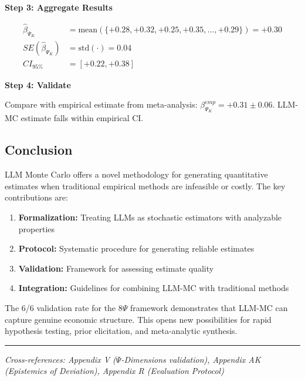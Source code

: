 \begin{tcolorbox}[colback=blue!5!white, colframe=blue!75!black,
    title=\textbf{Worked Example: LLM-MC Protocol Application}]
\textbf{Step 3: Aggregate Results}

\begin{align*}
\hat{\beta}_{\Psi_K} &= \text{mean}(\{+0.28, +0.32, +0.25, +0.35, \ldots, +0.29\}) = +0.30 \\
SE(\hat{\beta}_{\Psi_K}) &= \text{std}(\cdot) = 0.04 \\
CI_{95\%} &= [+0.22, +0.38]
\end{align*}

\textbf{Step 4: Validate}

Compare with empirical estimate from meta-analysis: $\beta_{\Psi_K}^{emp} = +0.31 \pm 0.06$.
LLM-MC estimate falls within empirical CI. \checkmark

\end{tcolorbox}


\subsection{Conclusion}

LLM Monte Carlo offers a novel methodology for generating quantitative estimates when traditional empirical methods are infeasible or costly. The key contributions are:

\begin{enumerate}
    \item \textbf{Formalization:} Treating LLMs as stochastic estimators with analyzable properties
    \item \textbf{Protocol:} Systematic procedure for generating reliable estimates
    \item \textbf{Validation:} Framework for assessing estimate quality
    \item \textbf{Integration:} Guidelines for combining LLM-MC with traditional methods
\end{enumerate}

The 6/6 validation rate for the 8$\Psi$ framework demonstrates that LLM-MC can capture genuine economic structure. This opens new possibilities for rapid hypothesis testing, prior elicitation, and meta-analytic synthesis.

\vspace{1em}
\hrule
\vspace{0.5em}
\noindent\textit{Cross-references: Appendix V ($\Psi$-Dimensions validation), Appendix AK (Epistemics of Deviation), Appendix R (Evaluation Protocol)}

